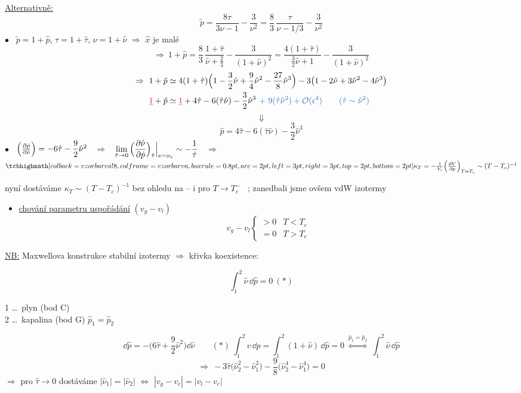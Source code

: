 \underline{Alternativně:}
\[ \tilde p = \frac{8\tau}{3\nu - 1} - \frac{3}{\nu^2} = \frac83\,\frac{\tau}{\nu - 1/3} - \frac{3}{\nu^2} \]
$\bullet$ \ $\tilde p = 1 + \hat p$, \quad $\tau = 1 + \hat\tau$, \quad $\nu = 1 + \hat\nu$ \quad $\Rightarrow$ $\hat x$ je malé
\[
  \Rightarrow\ 1 + \hat p = \frac83\,\frac{1 + \hat\tau}{\hat\nu + \frac23} - \frac{3}{(1 + \hat\nu)^2} = \frac{4(1 + \hat\tau)}{\frac32\hat\nu + 1} - \frac{3}{(1 + \hat\nu)^2}
\]
\begin{align*}
  \Rightarrow\ 1 + \hat p &\simeq 4(1 + \hat\tau)\Big(1 - \frac32\hat\nu + \frac94\hat\nu^2 - \frac{27}{8}\hat\nu^3\Big) - 3\big(1 - 2\hat\nu + 3\hat\nu^2 - 4\hat\nu^3\big) \\
  {\color{Red}\sout{1}} + \hat p &\simeq {\color{Red}\sout{1}} + 4\hat\tau - 6(\hat\tau\hat\nu) - \frac32\hat\nu^3
     \ {\color{NavyBlue}+\ 9(\hat\tau\hat\nu^2) + \mathcal{O}(\epsilon^4)} \qquad {\color{NavyBlue}(\hat\tau\sim\hat\nu^2)}
\end{align*}
\[ \Downarrow \]
\[ \boxed{\hat p = 4\hat\tau - 6(\hat\tau\hat\nu) - \frac32\hat\nu^3} \]
$\bullet$ \ $\Big(\pdv{\hat p}{\hat\nu}\Big) = -6\hat\tau - \dfrac92\hat\nu^2$ \ $\Rightarrow$ \
$\displaystyle\lim_{\hat\tau\to0}\Big(\pdv{\hat\nu}{\hat p}\Big)_{\hat\tau}\Big|_{\nu = \nu_c} \sim -\frac1{\hat\tau}$ \ $\Rightarrow$ \
$\vzorec{\kappa_T = -\frac1{V_c}\Big(\pdv{V}{p}\Big)_{T = T_c} \sim (T - T_c)^{-1}}$

\pozor{!} nyní dostáváme $\kappa_T\sim(T - T_c)^{-1}$ bez ohledu na  -- i pro $T\to T_c^-$
\ {\small; zanedbali jsme ovšem  vdW izotermy}

\begin{itemize}
  \item \underline{chování parametru uspořádání} $(v_g - v_l)$
  \[
    v_g - v_l \begin{cases} > 0 & T < T_c \\ = 0 & T > T_c \end{cases}
  \]
\end{itemize}

\underline{NB:} Maxwellova konstrukce stabilní izotermy $\Rightarrow$ křivka koexistence:

\begin{minipage}{0.4\textwidth}
\[ \boxed{\int_1^2\hat\nu\,\dd\hat p = 0}\ (*) \]
\end{minipage}
\begin{minipage}{0.58\textwidth}
1 \dots\ plyn (bod C) \\
2 \dots\ kapalina (bod G) \qquad $\hat p_1 = \hat p_2$
\end{minipage}
\[
  \dd\hat p = -\Big(6\hat\tau + \frac92\hat\nu^2\Big)\dd\hat\nu
  \qquad
  (*)\ \int_1^2 v\,\dd p = \int_1^2(1 + \hat\nu)\,\dd\hat p = 0 \ \overset{\hat p_1 = \hat p_2}{\Leftrightarrow}\ \int_1^2\hat\nu\,\dd\hat p
\]
\[ \Rightarrow\ -3\hat\tau\big(\hat\nu_2^2 - \hat\nu_1^2\big) - \frac98\big(\hat\nu_2^4 - \hat\nu_1^4\big) = 0 \]
$\Rightarrow$ pro $\hat\tau\to0$ dostáváme $|\hat\nu_1| = |\hat\nu_2|$ \quad $\Leftrightarrow$ \quad $|v_g - v_c| = |v_l - v_c|$

